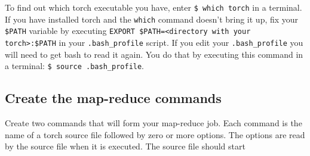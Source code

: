 \documentclass{article}
\let\code\texttt %
\begin{document}
To find out which torch executable you have, enter \code{\$ which torch} in
a terminal. If you have installed torch and the \code{which} command
doesn't bring it up, fix your \code{\$PATH} variable by executing 
\code{EXPORT \$PATH=<directory with your torch>:\$PATH} in your
\code{.bash\_profile} script. If you edit your \code{.bash\_profile} you
will need to get bash to read it again. You do that by executing this
command in a terminal: \code{\$ source .bash\_profile}.

\subsection{Create the map-reduce commands}

Create two commands that will form your map-reduce job. Each command is
the name of a torch source file followed by zero or more options. The
options are read by the source file when it is executed. The source file
should start
\end{document}
